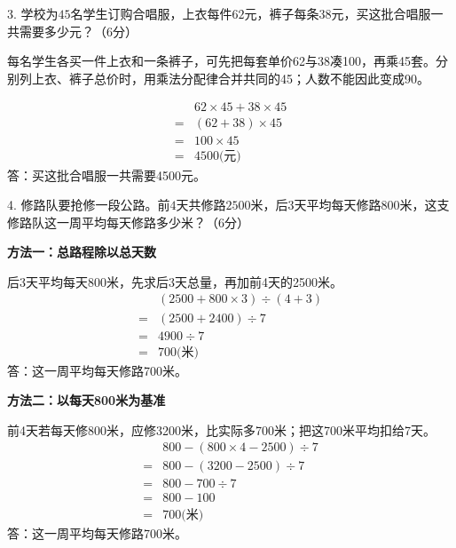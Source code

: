 3. 学校为\(45\)名学生订购合唱服，上衣每件\(62\)元，裤子每条\(38\)元，买这批合唱服一共需要多少元？（6分）\par
\begin{BookAnswer}
每名学生各买一件上衣和一条裤子，可先把每套单价62与38凑100，再乘45套。分别列上衣、裤子总价时，用乘法分配律合并共同的45；人数不能因此变成90。\par \[\begin{aligned}&62\times45+38\times45\\={}&(62+38)\times45\\={}&100\times45\\={}&4500\text{(元)}\end{aligned}\]答：买这批合唱服一共需要4500元。
\end{BookAnswer}

4. 修路队要抢修一段公路。前\(4\)天共修路\(2500\)米，后\(3\)天平均每天修路\(800\)米，这支修路队这一周平均每天修路多少米？（6分）\par
\begin{BookAnswer}
\textbf{方法一：总路程除以总天数}\par 后3天平均每天800米，先求后3天总量，再加前4天的2500米。\[\begin{aligned} &(2500+800\times3)\div(4+3)\\ ={}&(2500+2400)\div7\\ ={}&4900\div7\\ ={}&700\text{(米)}\end{aligned}\]答：这一周平均每天修路700米。\par \textbf{方法二：以每天800米为基准}\par 前4天若每天修800米，应修3200米，比实际多700米；把这700米平均扣给7天。\[\begin{aligned} &800-(800\times4-2500)\div7\\ ={}&800-(3200-2500)\div7\\ ={}&800-700\div7\\ ={}&800-100\\ ={}&700\text{(米)}\end{aligned}\]答：这一周平均每天修路700米。\par
\end{BookAnswer}

